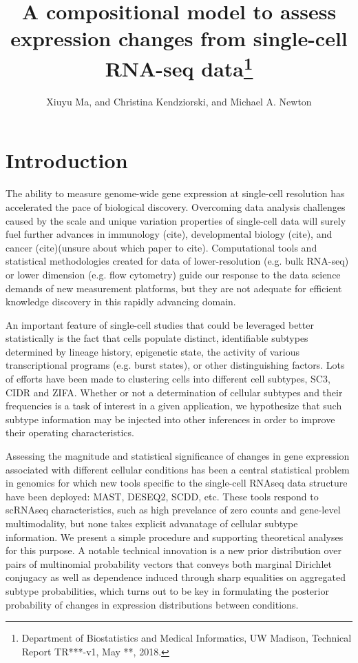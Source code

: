 \documentclass[11pt]{amsart}
\title{A compositional model to assess expression changes from
 single-cell RNA-seq data\footnote{Department of Biostatistics and Medical Informatics, UW Madison, Technical Report TR***-v1, May **, 2018.}}
\author{Xiuyu Ma,  and Christina Kendziorski, and Michael A. Newton}
\begin{document}
\maketitle
\section{Introduction}

The ability to measure genome-wide gene expression at single-cell resolution 
has accelerated the pace of biological discovery\cite{scs}.  Overcoming data
analysis challenges caused by the scale and unique variation properties of single-cell
data will surely fuel further advances in immunology (cite), developmental
biology (cite), and cancer (cite)(unsure about which paper to cite).  Computational tools and statistical methodologies 
created for data of lower-resolution (e.g. bulk RNA-seq) or lower dimension 
(e.g. flow cytometry)  guide our response to 
 the data science demands of new measurement platforms,
but they are not adequate for efficient knowledge discovery in this
rapidly advancing domain\cite{Bacher:2016aa}.

An important feature of single-cell studies that could be leveraged better
statistically is the fact that cells populate distinct, identifiable subtypes
determined by lineage history, epigenetic state, the activity
of various transcriptional programs (e.g. burst states), or other 
distinguishing factors. Lots of efforts have been made to clustering cells
into different cell subtypes, SC3\cite{sc3}, CIDR\cite{CIDR} and ZIFA\cite{ZIFA}.
Whether or not a determination of cellular subtypes and their frequencies 
is a task of interest in a given application, we hypothesize that such
subtype information may be injected into other inferences in order
to improve their operating characteristics.

Assessing the magnitude and statistical significance of changes in gene
expression associated with different cellular conditions has been a central
statistical problem in genomics for which new tools specific to
the single-cell RNAseq data structure have been deployed: MAST\cite{ref:MAST},
DESEQ2\cite{ref:Des}, SCDD\cite{ref:scDD}, etc.  These tools respond
to scRNAseq characteristics, such as high prevelance of zero counts and
gene-level multimodality, but none takes explicit advanatage of cellular subtype
information.  We present a simple procedure and supporting theoretical
analyses for this purpose.  A notable technical innovation is a new prior
distribution over pairs of multinomial probability vectors that conveys
both marginal Dirichlet conjugacy as well as
 dependence induced through sharp equalities on aggregated 
 subtype probabilities, which turns out to be key in formulating 
 the posterior probability of changes in expression distributions between conditions.
 
\end{document}
